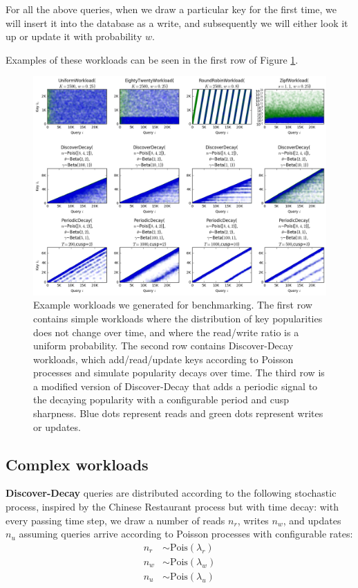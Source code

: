 \documentclass{sig-alternate-05-2015}
\begin{document}
For all the above queries, when we draw a particular key for the first time, we
will insert it into the database as a write, and subsequently we will either
look it up or update it with probability $w$.

Examples of these workloads can be seen in the first row of Figure
\ref{fig:workloads}.

\begin{figure}[!htb]
\begin{center}
\includegraphics[width=\textwidth]{workloads.png}
\end{center}
\caption{Example workloads we generated for benchmarking. The first row
  contains simple workloads where the distribution of key popularities does not
  change over time, and where the read/write ratio is a uniform probability.
  The second row contains Discover-Decay workloads, which add/read/update keys
  according to Poisson processes and simulate popularity decays over time. The
  third row is a modified version of Discover-Decay that adds a periodic signal
  to the decaying popularity with a configurable period and cusp sharpness. Blue
  dots represent reads and green dots represent writes or updates.}
\label{fig:workloads}
\end{figure}

\subsection{Complex workloads}

\textbf{Discover-Decay} queries are distributed according to the following
stochastic process, inspired by the Chinese Restaurant process \cite{crp} but
with time decay: with every passing time step, we draw a number of reads $n_r$,
writes $n_w$, and updates $n_u$ assuming queries arrive according to Poisson
processes with configurable rates: \[
\begin{split}
  n_r & \sim \textrm{Pois}(\lambda_r) \\
  n_w & \sim \textrm{Pois}(\lambda_w) \\
  n_u & \sim \textrm{Pois}(\lambda_u)
\end{split}
\]
\end{document}
